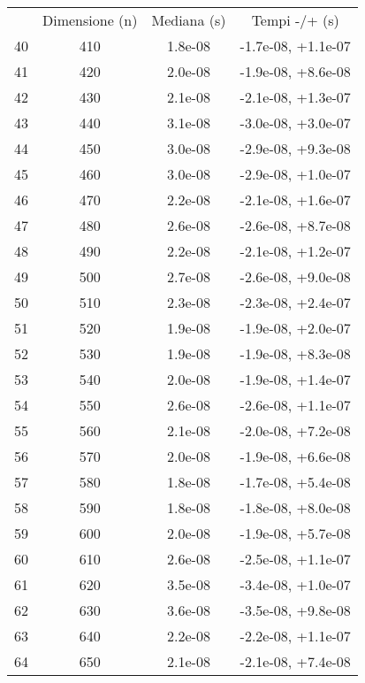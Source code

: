 \begin{table}
\centering
\begin{adjustbox}{width=1\textwidth/2}
\begin{tabular}{|c|c|c|c|}
\hline
 & Dimensione (n) & Mediana (s) & Tempi -/+ (s) \\
40 & 410 & 1.8e-08 & -1.7e-08, +1.1e-07 \\
\cline{1-4}
41 & 420 & 2.0e-08 & -1.9e-08, +8.6e-08 \\
\cline{1-4}
42 & 430 & 2.1e-08 & -2.1e-08, +1.3e-07 \\
\cline{1-4}
43 & 440 & 3.1e-08 & -3.0e-08, +3.0e-07 \\
\cline{1-4}
44 & 450 & 3.0e-08 & -2.9e-08, +9.3e-08 \\
\cline{1-4}
45 & 460 & 3.0e-08 & -2.9e-08, +1.0e-07 \\
\cline{1-4}
46 & 470 & 2.2e-08 & -2.1e-08, +1.6e-07 \\
\cline{1-4}
47 & 480 & 2.6e-08 & -2.6e-08, +8.7e-08 \\
\cline{1-4}
48 & 490 & 2.2e-08 & -2.1e-08, +1.2e-07 \\
\cline{1-4}
49 & 500 & 2.7e-08 & -2.6e-08, +9.0e-08 \\
\cline{1-4}
50 & 510 & 2.3e-08 & -2.3e-08, +2.4e-07 \\
\cline{1-4}
51 & 520 & 1.9e-08 & -1.9e-08, +2.0e-07 \\
\cline{1-4}
52 & 530 & 1.9e-08 & -1.9e-08, +8.3e-08 \\
\cline{1-4}
53 & 540 & 2.0e-08 & -1.9e-08, +1.4e-07 \\
\cline{1-4}
54 & 550 & 2.6e-08 & -2.6e-08, +1.1e-07 \\
\cline{1-4}
55 & 560 & 2.1e-08 & -2.0e-08, +7.2e-08 \\
\cline{1-4}
56 & 570 & 2.0e-08 & -1.9e-08, +6.6e-08 \\
\cline{1-4}
57 & 580 & 1.8e-08 & -1.7e-08, +5.4e-08 \\
\cline{1-4}
58 & 590 & 1.8e-08 & -1.8e-08, +8.0e-08 \\
\cline{1-4}
59 & 600 & 2.0e-08 & -1.9e-08, +5.7e-08 \\
\cline{1-4}
60 & 610 & 2.6e-08 & -2.5e-08, +1.1e-07 \\
\cline{1-4}
61 & 620 & 3.5e-08 & -3.4e-08, +1.0e-07 \\
\cline{1-4}
62 & 630 & 3.6e-08 & -3.5e-08, +9.8e-08 \\
\cline{1-4}
63 & 640 & 2.2e-08 & -2.2e-08, +1.1e-07 \\
\cline{1-4}
64 & 650 & 2.1e-08 & -2.1e-08, +7.4e-08 \\

\end{tabular}
\end{adjustbox}
\end{table}
